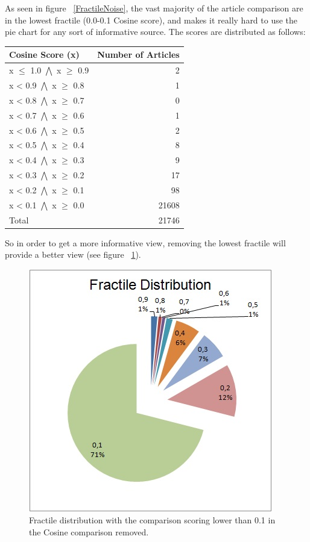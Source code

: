 As seen in figure ~\ref{FractileNoise}, the vast majority of the article comparison are in the lowest fractile (0.0-0.1 Cosine score), and makes it really hard to use the pie chart for any sort of informative source. The scores are distributed as follows:

\begin{center}
	\begin{tabular}{l | r}
		Cosine Score (x) & Number of Articles\\ \hline
		x $\leq$ 1.0 $\bigwedge$ x $\geq$ 0.9 & 2 \\ \hline
		x < 0.9 $\bigwedge$ x $\geq$ 0.8 & 1 \\ \hline
		x < 0.8 $\bigwedge$ x $\geq$ 0.7 & 0 \\ \hline
		x < 0.7 $\bigwedge$ x $\geq$ 0.6 & 1 \\ \hline
		x < 0.6 $\bigwedge$ x $\geq$ 0.5 & 2 \\ \hline
		x < 0.5 $\bigwedge$ x $\geq$ 0.4 & 8 \\ \hline
		x < 0.4 $\bigwedge$ x $\geq$ 0.3 & 9 \\ \hline
		x < 0.3 $\bigwedge$ x $\geq$ 0.2 & 17 \\ \hline
		x < 0.2 $\bigwedge$ x $\geq$ 0.1 & 98 \\ \hline
		x < 0.1 $\bigwedge$ x $\geq$ 0.0 & 21608 \\ \hline	
		Total & 21746 \\ \hline
	\end{tabular}
\end{center}

So in order to get a more informative view, removing the lowest fractile will provide a better view (see figure ~\ref{NoNoise}).

\begin{figure}
	\centering
	\includegraphics[scale=1.0]{figures/FractileNoNoise}
	\caption{Fractile distribution with the comparison scoring lower than 0.1 in the Cosine comparison removed.}
	\label{NoNoise}
\end{figure}

